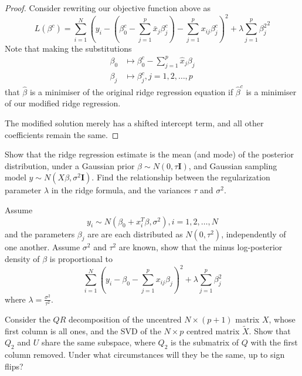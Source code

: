 \begin{proof}
    Consider rewriting our objective function above as  \[
        L(\beta^c) = \sum_{i=1}^{N}\left(y_i - \left(\beta_0^c - \sum_{j=1}^{p} \bar x_j \beta_j^c \right) - \sum_{j=1}^p x_{ij} \beta_j^c \right)^2 + \lambda \sum_{j=1}^p {\beta_j^2}^2
        \]
    Note that making the substitutions \begin{align*}
        \beta_0 &\mapsto \beta_0^c - \sum_{j=1}^p \hat x_j \beta_j \\
        \beta_j &\mapsto \beta^c_j, j = 1, 2, \dots, p
    \end{align*} that $\hat \beta$ is a minimiser of the original ridge regression equation if $\hat \beta^c$ is a minimiser of our modified ridge regression.  

    The modified solution merely has a shifted intercept term, and all other coefficients remain the same.  
\end{proof}

\begin{exer}
    Show that the ridge regression estimate is the mean (and mode) of the posterior distribution, under a Gaussian prior $\beta \sim N(0, \tau \mathbf{I})$, and Gaussian sampling model $y \sim N(X \beta, \sigma^2 \mathbf{I})$.  Find the relationship between the regularization parameter $\lambda$ in the ridge formula, and the variances $\tau$ and $\sigma^2$.
\end{exer}

\begin{exer}
    Assume 
    \[ y_i \sim N(\beta_0 + x_i^T \beta, \sigma^2), i = 1, 2, \dots, N \] and the parameters $\beta_j$ are are each distributed as $N(0, \tau^2)$, independently of one another.  Assume $\sigma^2$ and $\tau^2$ are known, show that the minus log-posterior density of $\beta$ is proportional to 
    \[ \sum_{i=1}^N \left( y_i - \beta_0 - \sum_{j=1}^p x_{ij} \beta_j \right)^2 + \lambda \sum_{j=1}^p \beta_j^2 \]
    where $\lambda = \frac{\sigma^2}{\tau^2}$.  
\end{exer}

\begin{exer}
    Consider the $QR$ decomposition of the uncentred $N \times (p+1)$ matrix $X$, whose first column is all ones, and the SVD of the $N \times p$ centred matrix $\tilde X$.  Show that $Q_2$ and $U$ share the same subspace, where $Q_2$ is the submatrix of $Q$ with the first column removed.  Under what circumstances will they be the same, up to sign flips?
\end{exer}

